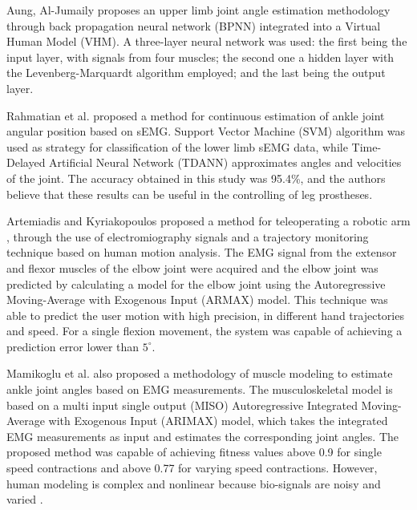 \documentclass[letterpaper, 10 pt, conference]{ieeeconf}  %
\begin{document}
% 
% 


Aung, Al-Jumaily \cite{Aung2013} proposes an upper limb joint angle estimation methodology through back propagation neural network (BPNN) integrated into a Virtual Human Model (VHM). A three-layer neural network was used: the first being the input layer, with signals from four muscles; the second one a hidden layer with the Levenberg-Marquardt algorithm employed; and the last being the output layer.

Rahmatian et al. \cite{Rahmatian2016158} proposed a method for continuous estimation of ankle joint angular position based on sEMG. Support Vector Machine (SVM) algorithm was used as strategy for classification of the lower limb sEMG data, while Time-Delayed Artificial Neural Network (TDANN) approximates angles and velocities of the joint. The accuracy obtained in this study was 95.4\%, and the authors believe that these results can be useful in the controlling of leg prostheses.

Artemiadis and Kyriakopoulos \cite{Artemiadis1642196} proposed a method for teleoperating a robotic arm , through the use of electromiography signals and a trajectory monitoring technique based on human motion analysis. The EMG signal from the extensor and flexor muscles of the elbow joint were acquired and the elbow joint was predicted by calculating a model for the elbow joint using the Autoregressive Moving-Average with Exogenous Input (ARMAX) model. This technique was able to predict the user motion with high precision, in different hand trajectories and speed. For a single flexion movement, the system was capable of achieving a prediction error lower than \(5^{\circ}\).

Mamikoglu et al. \cite{Mamikoglu2016785} also proposed a methodology of muscle modeling to estimate ankle joint angles based on EMG measurements. The musculoskeletal model is based on a multi input single output (MISO) Autoregressive Integrated Moving-Average with Exogenous Input (ARIMAX) model, which takes the integrated EMG measurements as input and estimates the corresponding joint angles. The proposed method was capable of achieving fitness values above 0.9 for single speed contractions and above 0.77 for varying speed contractions.%
 However, human modeling is complex and nonlinear because bio-signals are noisy and varied \cite{kato2015}.
\end{document}

